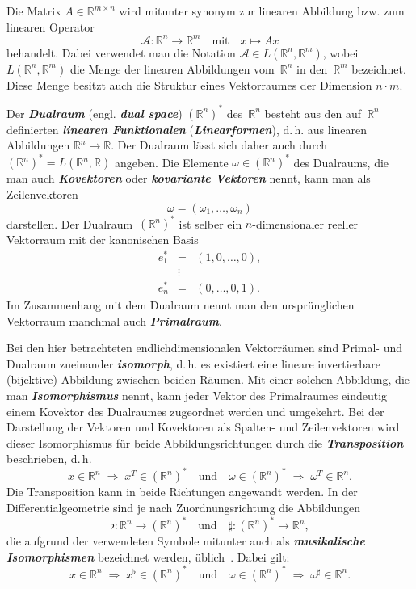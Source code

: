 Die Matrix $A\in{\mathbb{R}}^{m\times n}$ wird mitunter synonym zur linearen
Abbildung bzw. zum linearen Operator
\[
\mathcal{A}:{\mathbb{R}}^{n}\to{\mathbb{R}}^{m}\quad\text{mit}\quad x\mapsto Ax
\]
behandelt. Dabei verwendet man die Notation $\mathcal{A}\in L({\mathbb{R}}^{n},{\mathbb{R}}^{m})$,
wobei $L({\mathbb{R}}^{n},{\mathbb{R}}^{m})$ die Menge der linearen Abbildungen vom~${\mathbb{R}}^{n}$
in den~${\mathbb{R}}^{m}$ bezeichnet. Diese Menge besitzt auch die Struktur
eines Vektorraumes der Dimension $n\cdot m$.

Der \textbf{\em Dualraum} (engl. \textbf{\em dual space}) $({\mathbb{R}}^{n})^{*}$
des~${\mathbb{R}}^{n}$ besteht aus den auf~${\mathbb{R}}^{n}$ definierten \textbf{\em linearen
Funktionalen} (\textbf{\em Linearformen}), d.\,h. aus linearen Abbildungen
${\mathbb{R}}^{n}\to{\mathbb{R}}$. Der Dualraum lässt sich daher auch durch $({\mathbb{R}}^{n})^{*}=L({\mathbb{R}}^{n},{\mathbb{R}})$
angeben. Die Elemente $\omega\in({\mathbb{R}}^{n})^{*}$ des Dualraums, die
man auch \textbf{\em Kovektoren} oder \textbf{\em kovariante
Vektoren} nennt, kann man als Zeilenvektoren
\[
\omega=\left(\omega_{1},\ldots,\omega_{n}\right)
\]
darstellen. Der Dualraum~$({\mathbb{R}}^{n})^{*}$ ist selber ein $n$-dimensionaler
reeller Vektorraum mit der kanonischen Basis
\[
\begin{array}{lcl}
e_{1}^{*} & = & \left(1,0,\ldots,0\right),\\
 & \vdots\\
e_{n}^{*} & = & (0,\ldots,0,1).
\end{array}
\]
Im Zusammenhang mit dem Dualraum nennt man den ursprünglichen Vektorraum
manchmal auch \textbf{\em Primalraum}.

\begin{remark}
\label{rem:Isomorphismus-Primal-Dual}Bei den hier betrachteten endlichdimensionalen
Vektorräumen sind Primal- und Dualraum zueinander \textbf{\em isomorph},
d.\,h. es existiert eine lineare invertierbare (bijektive) Abbildung
zwischen beiden Räumen. Mit einer solchen Abbildung, die man \textbf{\em Isomorphismus}
nennt, kann jeder Vektor des Primalraumes eindeutig einem Kovektor
des Dualraumes zugeordnet werden und umgekehrt. Bei der Darstellung
der Vektoren und Kovektoren als Spalten- und Zeilenvektoren wird dieser
Isomorphismus für beide Abbildungsrichtungen durch die \textbf{\em Transposition}
beschrieben, d.\,h.
\[
x\in{\mathbb{R}}^{n}\;\Rightarrow\;x^{T}\in({\mathbb{R}}^{n})^{*}\quad\text{und}\quad\omega\in({\mathbb{R}}^{n})^{*}\;\Rightarrow\;\omega^{T}\in{\mathbb{R}}^{n}.
\]
Die Transposition kann in beide Richtungen angewandt werden. In der
Differentialgeometrie sind je nach Zuordnungsrichtung die Abbildungen
\[
\flat:{\mathbb{R}}^{n}\to({\mathbb{R}}^{n})^{*}\quad\text{und}\quad\sharp:({\mathbb{R}}^{n})^{*}\to{\mathbb{R}}^{n},
\]
die aufgrund der verwendeten Symbole mitunter auch als \textbf{\em musikalische
Isomorphismen} bezeichnet werden,
üblich~\cite{marsden2001,bullo2004,jaenich2005}. Dabei gilt:
\[
x\in{\mathbb{R}}^{n}\;\Rightarrow\;x^{\flat}\in({\mathbb{R}}^{n})^{*}\quad\text{und}\quad\omega\in({\mathbb{R}}^{n})^{*}\;\Rightarrow\;\omega^{\sharp}\in{\mathbb{R}}^{n}.
\]
\end{remark}

